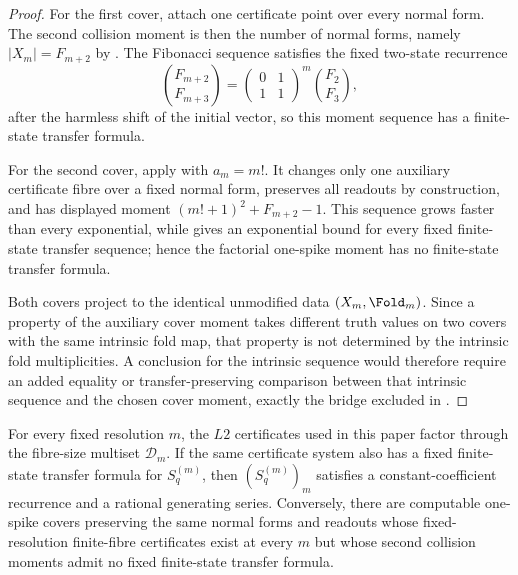 \begin{proof}
For the first cover, attach one certificate point over every normal form.  The
second collision moment is then the number of normal forms, namely
\(\lvert X_m\rvert=F_{m+2}\) by .  The Fibonacci
sequence satisfies the fixed two-state recurrence
\[
  \binom{F_{m+2}}{F_{m+3}}
  =
  \begin{pmatrix}0&1\\ 1&1\end{pmatrix}^{m}
  \binom{F_2}{F_3},
\]
after the harmless shift of the initial vector, so this moment sequence has a
finite-state transfer formula.

For the second cover, apply  with
\(a_m=m!\).  It changes only one auxiliary certificate fibre over a fixed normal
form, preserves all readouts by construction, and has displayed moment
\((m!+1)^2+F_{m+2}-1\).  This sequence grows faster than every exponential, while
 gives an exponential bound for every
fixed finite-state transfer sequence; hence the factorial one-spike moment has
no finite-state transfer formula.

Both covers project to the identical unmodified data \((X_m,\Fold_m)\).  Since a
property of the auxiliary cover moment takes different truth values on two
covers with the same intrinsic fold map, that property is not determined by the
intrinsic fold multiplicities.  A conclusion for the intrinsic sequence would
therefore require an added equality or transfer-preserving comparison between
that intrinsic sequence and the chosen cover moment, exactly the bridge excluded
in .
\end{proof}

\begin{proposition}
\label{thm:L2-fiber-multiset-factorization}
\label{thm:L2-finite-fiber-transfer-pairing}
For every fixed resolution \(m\), the \(L2\) certificates used in this paper
factor through the fibre-size multiset \(\mathcal D_m\).  If the same certificate
system also has a fixed finite-state transfer formula for \(S_q^{(m)}\), then
\((S_q^{(m)})_m\) satisfies a constant-coefficient recurrence and a rational
generating series.  Conversely, there are computable one-spike covers preserving
the same normal forms and readouts whose fixed-resolution finite-fibre
certificates exist at every \(m\) but whose second collision moments admit no
fixed finite-state transfer formula.
\end{proposition}

